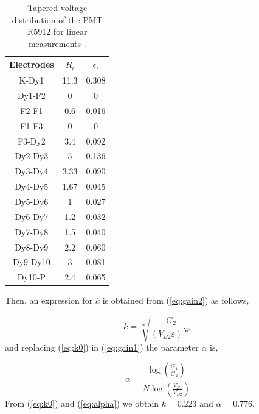 \documentclass[letterpaper, 10 pt, conference]{ieeeconf}  %
\begin{document}
\begin{table}[ht]
\centering
  \caption{Tapered voltage distribution of the PMT R5912 for linear measurements \cite{Hamamatsu2019}.}
  \begin{tabular}{ | c | c | c |}
    \hline
    Electrodes & $R_i$ & $\epsilon_i$ \\ \hline
    K-Dy1 & 11.3 & 0.308 \\ \hline
    Dy1-F2 & 0 & 0 \\ \hline
    F2-F1 &  0.6 & 0.016 \\ \hline
    F1-F3 & 0 & 0 \\ \hline
    F3-Dy2 & 3.4 & 0.092 \\ \hline
    Dy2-Dy3 & 5 & 0.136 \\ \hline
    Dy3-Dy4 & 3.33 & 0.090 \\ \hline
    Dy4-Dy5 & 1.67 & 0.045 \\ \hline
    Dy5-Dy6 & 1 & 0.027 \\ \hline
    Dy6-Dy7 & 1.2 & 0.032 \\ \hline
    Dy7-Dy8 & 1.5 & 0.040 \\ \hline
    Dy8-Dy9 & 2.2 & 0.060 \\ \hline
    Dy9-Dy10 & 3 & 0.081 \\ \hline
    Dy10-P & 2.4 & 0.065 \\
    \hline
  \end{tabular}
  \label{net}
\end{table}


Then, an expression for $k$ is obtained from (\ref{eq:gain2}) as follows,

\begin{equation}
k=\sqrt[N]{\frac{G_2}{(V_{B2}\varepsilon)^{N \alpha}}}
\label{eq:k0}
\end{equation}
\noindent and replacing (\ref{eq:k0}) in (\ref{eq:gain1}) the parameter $\alpha$ is,

\begin{equation}
\alpha=\frac{\log \left( \frac{G_1}{G_2} \right)}{N \log \left( \frac{V_{B1}}{V_{B2}} \right)}
\label{eq:alpha}
\end{equation}
From (\ref{eq:k0}) and (\ref{eq:alpha}) we obtain $k=0.223$ and $\alpha= 0.776$.
\end{document}
